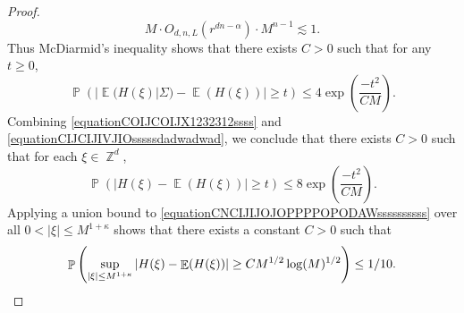 \documentclass[dvipsnames,letterpaper,12pt]{article}
\numberwithin{equation}{section}
\DeclareMathOperator{\ZZ}{\mathbb{Z}}
\newtheorem{lemma}[theorem]{Lemma}
\numberwithin{theorem}{section}
\DeclareMathOperator{\EE}{\mathbb{E}}
\DeclareMathOperator{\PP}{\mathbb{P}}
\begin{document}
\begin{proof}
    \begin{equation}
        M \cdot O_{d,n,L}(r^{dn - \alpha}) \cdot M^{n-1} \lesssim 1.
    \end{equation}
    Thus McDiarmid's inequality shows that there exists $C > 0$ such that for any $t \geq 0$,
    \begin{equation} \label{equationCIJCIJIVJIOsssssdadwadwad}
        \PP \left( |\EE(H(\xi)|\Sigma) - \EE(H(\xi))| \geq t \right) \leq 4 \exp \left( \frac{-t^2}{CM} \right).
    \end{equation}
    Combining \eqref{equationCOIJCOIJX1232312ssss} and \eqref{equationCIJCIJIVJIOsssssdadwadwad}, we conclude that there exists $C > 0$ such that for each $\xi \in \ZZ^d$,
    \begin{equation} \label{equationCNCIJIJOJOPPPPOPODAWssssssssss}
        \PP \left( | H(\xi) - \EE(H(\xi)) | \geq t  \right) \leq 8 \exp \left( \frac{-t^2}{CM} \right).
    \end{equation}
    Applying a union bound to \eqref{equationCNCIJIJOJOPPPPOPODAWssssssssss} over all $0 < |\xi| \leq M^{1 + \kappa}$ shows that there exists a constant $C > 0$ such that
    \[ \PP \left( \sup_{|\xi| \leq M^{1 + \kappa}} | H(\xi) - \EE(H(\xi)) | \geq C M^{1/2} \log(M)^{1/2} \right) \leq 1/10. \qedhere \]
\end{proof}

\begin{comment}

\begin{lemma} \label{equationDIOJDOIJCIJ}
    Let $S$ be the set of indices $k_1 \in \{ 1, \dots, K \}$ such that there are indices $k_2,\dots,k_n \in \{ 1,\dots,K \}$ with the property that
    \[ |X_1(k_1) - f(X_2(k_2),\dots,X_n(k_n))| \leq (L+1)r. \]
    Then if $k_1 \not \in S$ and $k_2,\dots,k_n \in \{ 1,\dots,K \}$, if $X = (X_{k_1}^1,\dots,X_{k_n}^n)$, then $d(X,W) \geq r$.
\end{lemma}
\begin{proof}
    It follows by definition that
    \[ |X_1(k_1) - f(X_2(k_2),\dots,X_n(k_n))| \geq (L+1)r. \]
    If $Y = (Y_1,\dots,Y_n) \in W \cap (Q_1 \times \dots \times Q_n)$, then
    \begin{align*}
        (L+1)r &\leq |X_1(k_1) - f(X_2(k_2),\dots,X_n(k_n))|\\
        &\leq |X_1(k_1) - Y_1| + |Y_1 - f(X_2(k_2),\dots,X_n(k_n)|\\
        &= |X_1(k_1) - Y_1| + |f(Y_2,\dots,Y_n) - f(X_2(k_2),\dots,X_n(k_n)|\\
        &\leq |X_1(k_1) - Y_1| + L|(Y_2,\dots,Y_n) - (X_2(k_2),\dots,X_n(k_n))\\
        &\leq (L+1) |X - Y|,
    \end{align*}
    so $|X-Y| \geq r$.
\end{proof}

\end{comment}
\end{document}
